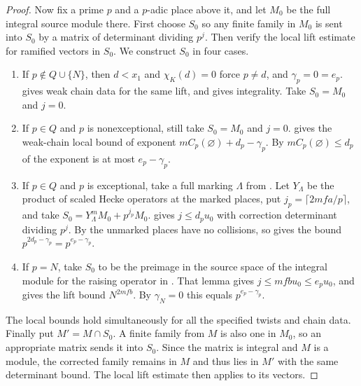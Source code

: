 \begin{proof}
Now fix a prime $p$ and a $p$-adic place above it, and let $M_0$ be the full integral source module there. First choose $S_0$ so any finite family in $M_0$ is sent into $S_0$ by a matrix of determinant dividing $p^j$. Then verify the local lift estimate for ramified vectors in $S_0$. We construct $S_0$ in four cases.
\begin{enumerate}
\item If $p\notin Q\cup\{N\}$, then $d<x_1$ and $\chi_K(d)=0$ force $p\ne d$, and $\gamma_p=0=e_p$.  gives weak chain data for the same lift, and  gives integrality. Take $S_0=M_0$ and $j=0$.
\item If $p\in Q$ and $p$ is nonexceptional, still take $S_0=M_0$ and $j=0$.  gives the weak-chain local bound of exponent $mC_p(\varnothing)+d_p-\gamma_p$. By $mC_p(\varnothing)\le d_p$ of  the exponent is at most $e_p-\gamma_p$.
\item If $p\in Q$ and $p$ is exceptional, take a full marking $\Lambda$ from . Let $Y_\Lambda$ be the product of scaled Hecke operators at the marked places, put $j_p=\lceil 2mfa/p\rceil$, and take $S_0=Y_\Lambda^m M_0+p^{j_p}M_0$.  gives $j\le d_pu_0$ with correction determinant dividing $p^j$. By  the unmarked places have no collisions, so  gives the bound $p^{2d_p-\gamma_p}=p^{e_p-\gamma_p}$.
\item If $p=N$, take $S_0$ to be the preimage in the source space of the integral module for the raising operator in . That lemma gives $j\le mfbu_0\le e_pu_0$, and  gives the lift bound $N^{2mfb}$. By $\gamma_N=0$ this equals $p^{e_p-\gamma_p}$.
\end{enumerate}
The local bounds hold simultaneously for all the specified twists and chain data. Finally put $M'=M\cap S_0$. A finite family from $M$ is also one in $M_0$, so an appropriate matrix sends it into $S_0$. Since the matrix is integral and $M$ is a module, the corrected family remains in $M$ and thus lies in $M'$ with the same determinant bound. The local lift estimate then applies to its vectors.
\end{proof}

